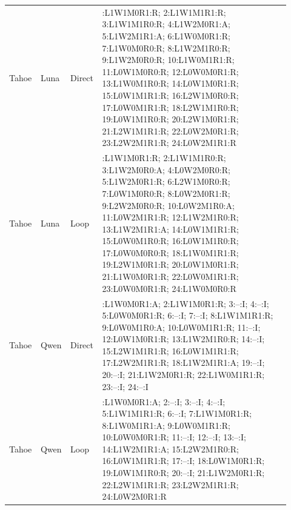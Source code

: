 \begin{longtable}{@{}p{0.10\linewidth}p{0.08\linewidth}p{0.08\linewidth}>{\raggedright\arraybackslash}p{0.66\linewidth}@{}}
Tahoe & Luna & Direct & 1:L1W1M0R1:R; 2:L1W1M1R1:R; 3:L1W1M1R0:R; 4:L1W2M0R1:A; 5:L1W2M1R1:A; 6:L1W0M0R1:R; 7:L1W0M0R0:R; 8:L1W2M1R0:R; 9:L1W2M0R0:R; 10:L1W0M1R1:R; 11:L0W1M0R0:R; 12:L0W0M0R1:R; 13:L1W0M1R0:R; 14:L0W1M0R1:R; 15:L0W1M1R1:R; 16:L2W1M0R0:R; 17:L0W0M1R1:R; 18:L2W1M1R0:R; 19:L0W1M1R0:R; 20:L2W1M0R1:R; 21:L2W1M1R1:R; 22:L0W2M0R1:R; 23:L2W2M1R1:R; 24:L0W2M1R1:R \\[3pt]
Tahoe & Luna & Loop & 1:L1W1M0R1:R; 2:L1W1M1R0:R; 3:L1W2M0R0:A; 4:L0W2M0R0:R; 5:L1W2M0R1:R; 6:L2W1M0R0:R; 7:L0W1M0R0:R; 8:L0W2M0R1:R; 9:L2W2M0R0:R; 10:L0W2M1R0:A; 11:L0W2M1R1:R; 12:L1W2M1R0:R; 13:L1W2M1R1:A; 14:L0W1M1R1:R; 15:L0W0M1R0:R; 16:L0W1M1R0:R; 17:L0W0M0R0:R; 18:L1W0M1R1:R; 19:L2W1M0R1:R; 20:L0W1M0R1:R; 21:L1W0M0R1:R; 22:L0W0M1R1:R; 23:L0W0M0R1:R; 24:L1W0M0R0:R \\[3pt]
Tahoe & Qwen & Direct & 1:L1W0M0R1:A; 2:L1W1M0R1:R; 3:--:I; 4:--:I; 5:L0W0M0R1:R; 6:--:I; 7:--:I; 8:L1W1M1R1:R; 9:L0W0M1R0:A; 10:L0W0M1R1:R; 11:--:I; 12:L0W1M0R1:R; 13:L1W2M1R0:R; 14:--:I; 15:L2W1M1R1:R; 16:L0W1M1R1:R; 17:L2W2M1R1:R; 18:L1W2M1R1:A; 19:--:I; 20:--:I; 21:L1W2M0R1:R; 22:L1W0M1R1:R; 23:--:I; 24:--:I \\[3pt]
Tahoe & Qwen & Loop & 1:L1W0M0R1:A; 2:--:I; 3:--:I; 4:--:I; 5:L1W1M1R1:R; 6:--:I; 7:L1W1M0R1:R; 8:L1W0M1R1:A; 9:L0W0M1R1:R; 10:L0W0M0R1:R; 11:--:I; 12:--:I; 13:--:I; 14:L1W2M1R1:A; 15:L2W2M1R0:R; 16:L0W1M1R1:R; 17:--:I; 18:L0W1M0R1:R; 19:L0W1M1R0:R; 20:--:I; 21:L1W2M0R1:R; 22:L2W1M1R1:R; 23:L2W2M1R1:R; 24:L0W2M0R1:R \\[3pt]
\end{longtable}
\endgroup
